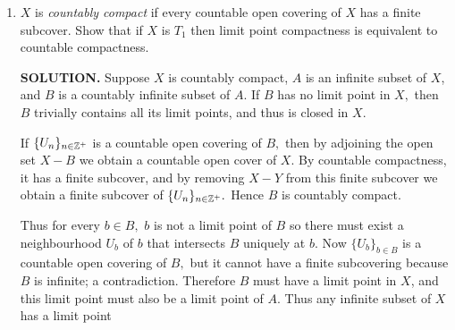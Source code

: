 \documentclass{article}
\begin{document}
\begin{enumerate}
\begin{enumerate}
        {\bf SOLUTION.} If $B$ is an infinite subset of $A,$ then by limit point compactness of $X$, $B$ has a limit point $x \in X.$ Every neighbourhood of $x$ intersects, $B\subseteq A,$ so $x$ is also a limit point of $A.$ By closure of $A,$ $x \in A.$ Therefore any infinite subset $B$ of $A$ has a limit point in $A.$ $\Box$

        \item If $X$ is a subspace of a Hausdorff space $Z,$ does it follow that $X$ is closed in $Z?$

        {\bf SOLUTION.} Consider $\overline{S_\Omega}$ in the order topology, which we know is Hausdorff. We also know that $S_\Omega$ is a limit point compact subspace of $\overline{S_\Omega},$ but it is not closed because $\Omega \notin S_\Omega.$ $\Box$
    \end{enumerate}

    \item $X$ is {\it countably compact} if every countable open covering of $X$ has a finite subcover. Show that if $X$ is $T_1$ then limit point compactness is equivalent to countable compactness.

    {\bf SOLUTION.} Suppose $X$ is countably compact, $A$ is an infinite subset of $X$, and $B$ is a countably infinite subset of $A.$ If $B$ has no limit point in $X,$ then $B$ trivially contains all its limit points, and thus is closed in $X.$
    
    If $\{U_n\}_{n \in \mathbb{Z}^+}$ is a countable open covering of $B,$ then by adjoining the open set $X-B$ we obtain a countable open cover of $X.$ By countable compactness, it has a finite subcover, and by removing $X-Y$ from this finite subcover we obtain a finite subcover of $\{U_n\}_{n \in \mathbb{Z}^+}.$ Hence $B$ is countably compact. 
    
    Thus for every $b \in B,$ $b$ is not a limit point of $B$ so there must exist a neighbourhood $U_b$ of $b$ that intersects $B$ uniquely at $b$. Now $\{U_b\}_{b \in B}$ is a countable open covering of $B,$ but it cannot have a finite subcovering because $B$ is infinite; a contradiction. Therefore $B$ must have a limit point in $X$, and this limit point must also be a limit point of $A.$ Thus any infinite subset of $X$ has a limit point


\end{enumerate}
\end{document}
